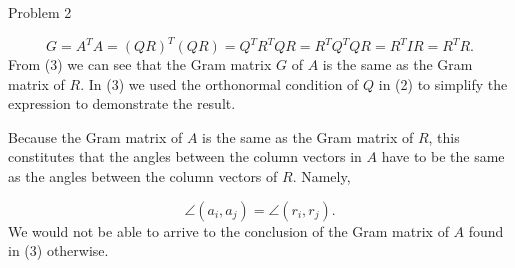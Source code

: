\begin{problem}{Problem 2}
\begin{Highlight}[Solution]
        \begin{equation}
            G = A^{T}A = (QR)^{T}(QR) = Q^{T}R^{T}QR = R^{T}Q^{T}QR = R^{T}IR = R^{T}R.
        \end{equation}
        From (3) we can see that the Gram matrix $G$ of $A$ is the same as the Gram matrix of $R$. In (3) we used the orthonormal condition of $Q$ in (2) to simplify the expression to demonstrate the
        result.

        Because the Gram matrix of $A$ is the same as the Gram matrix of $R$, this constitutes that the angles between the column vectors in $A$ have to be the same as the angles between the column
        vectors of $R$. Namely,

        \begin{equation}
            \angle (a_{i},a_{j}) = \angle (r_{i},r_{j}).
        \end{equation}
        We would not be able to arrive to the conclusion of the Gram matrix of $A$ found in (3) otherwise.
    \end{Highlight}
\end{problem}

